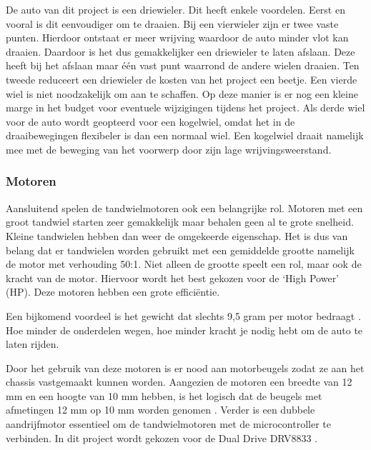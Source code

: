 \documentclass[a4paper,twoside,kulak]{kulakreport} %
\begin{document}
De auto van dit project is een driewieler. Dit heeft enkele voordelen. Eerst en vooral is dit eenvoudiger om te draaien. Bij een vierwieler zijn er twee vaste punten. Hierdoor ontstaat er meer wrijving waardoor de auto minder vlot kan draaien. Daardoor is het dus gemakkelijker een driewieler te laten afslaan. Deze heeft bij het afslaan maar één vast punt waarrond de andere wielen draaien. 
Ten tweede reduceert een driewieler de kosten van het project een beetje. Een vierde wiel is niet noodzakelijk om aan te schaffen. Op deze manier is er nog een kleine marge in het budget voor eventuele wijzigingen tijdens het project. Als derde wiel voor de auto wordt geopteerd voor een kogelwiel, omdat het in de draaibewegingen flexibeler is dan een normaal wiel. Een kogelwiel draait namelijk mee met de beweging van het voorwerp door zijn lage wrijvingsweerstand.
\label{Wielen}


\subsubsection{Motoren}
Aansluitend spelen de tandwielmotoren ook een belangrijke rol. Motoren met een groot tandwiel starten zeer gemakkelijk maar behalen geen al te grote snelheid. Kleine tandwielen hebben dan weer de omgekeerde eigenschap. Het is dus van belang dat er tandwielen worden gebruikt met een gemiddelde grootte namelijk de motor met verhouding 50:1. Niet alleen de grootte speelt een rol, maar ook de kracht van de motor. Hiervoor wordt het best gekozen voor de `High Power' (HP). Deze motoren hebben een grote efficiëntie. 

Een bijkomend voordeel is het gewicht dat slechts 9,5 gram per motor bedraagt \cite{MicroMetalGearMotor50:1HP}. %
Hoe minder de onderdelen wegen, hoe minder kracht je nodig hebt om de auto te laten rijden. 

Door het gebruik van deze motoren is er nood aan motorbeugels zodat ze aan het chassis vastgemaakt kunnen worden. Aangezien de motoren een breedte van 12 mm en een hoogte van 10 mm hebben, is het logisch dat de beugels met afmetingen 12 mm op 10 mm worden genomen \cite{MicroMetalGearMotorBeugel}.
Verder is een dubbele aandrijfmotor essentieel om de tandwielmotoren met de microcontroller te verbinden. In dit project wordt gekozen voor de Dual Drive DRV8833 \cite{DualDriveDRV8833}. 
\label{Motoren}
\end{document}
